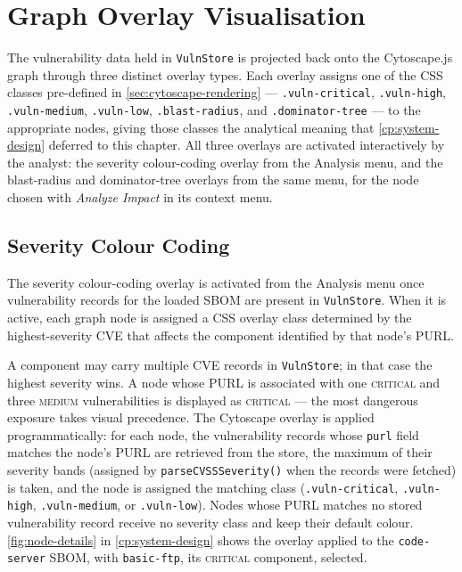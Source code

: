 \section{Graph Overlay Visualisation}
\label{sec:graph-overlay}

The vulnerability data held in \texttt{VulnStore} is projected back onto the Cytoscape.js graph through three distinct overlay types. Each overlay assigns one of the CSS classes pre-defined in \autoref{sec:cytoscape-rendering} --- \texttt{.vuln-critical}, \texttt{.vuln-high}, \texttt{.vuln-medium}, \texttt{.vuln-low}, \texttt{.blast-radius}, and \texttt{.dominator-tree} --- to the appropriate nodes, giving those classes the analytical meaning that \autoref{cp:system-design} deferred to this chapter. All three overlays are activated interactively by the analyst: the severity colour-coding overlay from the Analysis menu, and the blast-radius and dominator-tree overlays from the same menu, for the node chosen with \emph{Analyze Impact} in its context menu.


\subsection{Severity Colour Coding}
\label{sec:severity-colour}

The severity colour-coding overlay is activated from the Analysis menu once vulnerability records for the loaded SBOM are present in \texttt{VulnStore}. When it is active, each graph node is assigned a CSS overlay class determined by the highest-severity CVE that affects the component identified by that node's PURL.

A component may carry multiple CVE records in \texttt{VulnStore}; in that case the highest severity wins. A node whose PURL is associated with one \textsc{critical} and three \textsc{medium} vulnerabilities is displayed as \textsc{critical} --- the most dangerous exposure takes visual precedence. The Cytoscape overlay is applied programmatically: for each node, the vulnerability records whose \texttt{purl} field matches the node's PURL are retrieved from the store, the maximum of their severity bands (assigned by \texttt{parseCVSSSeverity()} when the records were fetched) is taken, and the node is assigned the matching class (\texttt{.vuln-critical}, \texttt{.vuln-high}, \texttt{.vuln-medium}, or \texttt{.vuln-low}). Nodes whose PURL matches no stored vulnerability record receive no severity class and keep their default colour. \autoref{fig:node-details} in \autoref{cp:system-design} shows the overlay applied to the \texttt{code-server} SBOM, with \texttt{basic-ftp}, its \textsc{critical} component, selected.



